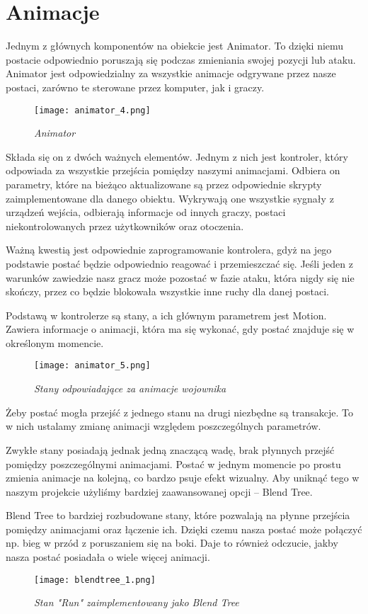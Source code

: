 \section{Animacje}
Jednym z głównych komponentów na obiekcie jest Animator.
To dzięki niemu postacie odpowiednio poruszają się podczas zmieniania swojej pozycji lub ataku.
Animator jest odpowiedzialny za wszystkie animacje odgrywane przez nasze postaci, zarówno te sterowane przez komputer, jak i graczy.

    \begin{figure}[H]
    \center
    \texttt{[image: animator\_4.png]}
    \caption{ \textit{Animator}}
    \end{figure}

Składa się on z dwóch ważnych elementów. Jednym z nich jest kontroler, który odpowiada za wszystkie przejścia pomiędzy naszymi animacjami. Odbiera on parametry, które na bieżąco aktualizowane są przez odpowiednie skrypty zaimplementowane dla danego obiektu. Wykrywają one wszystkie sygnały z urządzeń wejścia, odbierają informacje od innych graczy, postaci niekontrolowanych przez użytkowników oraz otoczenia.

Ważną kwestią jest odpowiednie zaprogramowanie kontrolera, gdyż na jego podstawie postać będzie odpowiednio reagować i przemieszczać się. Jeśli jeden z warunków zawiedzie nasz gracz może pozostać w fazie ataku, która nigdy się nie skończy, przez co będzie blokowała wszystkie inne ruchy dla danej postaci.

Podstawą w kontrolerze są stany, a ich głównym parametrem jest Motion. Zawiera informacje o animacji, która ma się wykonać, gdy postać znajduje się w określonym momencie.

\begin{figure}[H]
    \center
    \texttt{[image: animator\_5.png]}
    \caption{ \textit{Stany odpowiadające za animacje wojownika}}
    \end{figure}

Żeby postać mogła przejść z jednego stanu na drugi niezbędne są transakcje. To w nich ustalamy zmianę animacji względem poszczególnych parametrów. 

Zwykłe stany posiadają jednak jedną znaczącą wadę, brak płynnych przejść pomiędzy poszczególnymi animacjami. Postać w jednym momencie po prostu zmienia animacje na kolejną, co bardzo psuje efekt wizualny. Aby uniknąć tego w naszym projekcie użyliśmy bardziej zaawansowanej opcji – Blend Tree.

Blend Tree to bardziej rozbudowane stany, które pozwalają na płynne przejścia pomiędzy animacjami oraz łączenie ich. Dzięki czemu nasza postać może połączyć np. bieg w przód z poruszaniem się na boki. Daje to również odczucie, jakby nasza postać posiadała o wiele więcej animacji.
\begin{figure}[H]
    \center
    \texttt{[image: blendtree\_1.png]}
    \caption{ \textit{Stan "Run"  zaimplementowany jako Blend Tree}}
    \end{figure}


